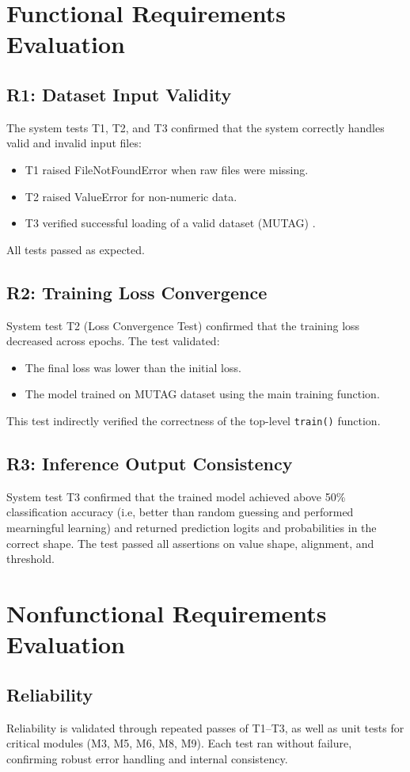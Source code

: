 \documentclass[12pt, titlepage]{article}
\begin{document}
\section{Functional Requirements Evaluation}
\subsection{R1: Dataset Input Validity}
The system tests T1, T2, and T3 confirmed that the system correctly handles valid and invalid input files:
\begin{itemize}
\item T1 raised FileNotFoundError when raw files were missing.
\item T2 raised ValueError for non-numeric data.
\item T3 verified successful loading of a valid dataset (MUTAG) \citep{debnath1991structure}.
\end{itemize}
All tests passed as expected.

\subsection{R2: Training Loss Convergence}
System test T2 (Loss Convergence Test) confirmed that the training loss decreased across epochs. The test validated:
\begin{itemize}
\item The final loss was lower than the initial loss.
\item The model trained on MUTAG dataset \citep{debnath1991structure} using the main training function.
\end{itemize}
This test indirectly verified the correctness of the top-level \texttt{train()} function.

\subsection{R3: Inference Output Consistency}
System test T3 confirmed that the trained model achieved above 50\% classification accuracy (i.e, better than random guessing and performed mearningful learning) and returned prediction logits and probabilities in the correct shape. The test passed all assertions on value shape, alignment, and threshold.

\section{Nonfunctional Requirements Evaluation}
\subsection{Reliability}
Reliability is validated through repeated passes of T1--T3, as well as unit tests for critical modules (M3, M5, M6, M8, M9). Each test ran without failure, confirming robust error handling and internal consistency.
\end{document}
